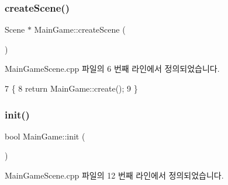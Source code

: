 \mbox{\label{class_main_game_a4d902c709107b834b3cb1dcb8debc1aa}} 
\subsubsection{\texorpdfstring{create\+Scene()}{createScene()}}
{\footnotesize\ttfamily Scene $\ast$ Main\+Game\+::create\+Scene (\begin{DoxyParamCaption}{ }\end{DoxyParamCaption})\hspace{0.3cm}{\ttfamily [static]}}



Main\+Game\+Scene.\+cpp 파일의 6 번째 라인에서 정의되었습니다.


\begin{DoxyCode}
7 \{
8     \textcolor{keywordflow}{return} MainGame::create();
9 \}
\end{DoxyCode}
\mbox{\label{class_main_game_ab518edeb854c0447539b829790397dc6}} 
\subsubsection{\texorpdfstring{init()}{init()}}
{\footnotesize\ttfamily bool Main\+Game\+::init (\begin{DoxyParamCaption}{ }\end{DoxyParamCaption})\hspace{0.3cm}{\ttfamily [virtual]}}



Main\+Game\+Scene.\+cpp 파일의 12 번째 라인에서 정의되었습니다.


